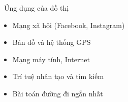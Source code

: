 \documentclass{beamer}
\begin{document}
\begin{frame}{\faNetworkWired\ Ứng dụng của đồ thị}
\begin{tcolorbox}
\begin{itemize}
\item Mạng xã hội (Facebook, Instagram)
\item Bản đồ và hệ thống GPS
\item Mạng máy tính, Internet
\item Trí tuệ nhân tạo và tìm kiếm
\item Bài toán đường đi ngắn nhất
\end{itemize}
\end{tcolorbox}
\end{frame}

\end{document}
